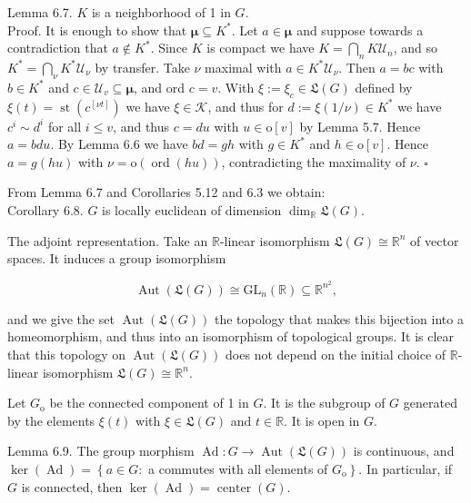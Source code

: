 \documentclass[10pt]{article}
\begin{document}
Lemma 6.7. $K$ is a neighborhood of 1 in $G$.\\
Proof. It is enough to show that $\boldsymbol{\mu} \subseteq K^{*}$. Let $a \in \boldsymbol{\mu}$ and suppose towards a contradiction that $a \notin K^{*}$. Since $K$ is compact we have $K=\bigcap_{n} K \mathcal{U}_{n}$, and so $K^{*}=\bigcap_{\nu} K^{*} \mathcal{U}_{\nu}$ by transfer. Take $\nu$ maximal with $a \in K^{*} \mathcal{U}_{\nu}$. Then $a=b c$ with $b \in K^{*}$ and $c \in \mathcal{U}_{v} \subseteq \boldsymbol{\mu}$, and ord $c=v$. With $\xi:=\xi_{c} \in \mathfrak{L}(G)$ defined by $\xi(t)=\operatorname{st}\left(c^{[\nu t]}\right)$ we have $\xi \in \mathcal{K}$, and thus for $d:=\xi(1 / \nu) \in K^{*}$ we have $c^{i} \sim d^{i}$ for all $i \leq v$, and thus $c=d u$ with $u \in \mathrm{o}[v]$ by Lemma 5.7. Hence $a=b d u$. By Lemma 6.6 we have $b d=g h$ with $g \in K^{*}$ and $h \in \mathrm{o}[v]$. Hence $a=g(h u)$ with $\nu=\mathrm{o}(\operatorname{ord}(h u))$, contradicting the maximality of $\nu$. \(\square\)

From Lemma 6.7 and Corollaries 5.12 and 6.3 we obtain:\\
Corollary 6.8. $G$ is locally euclidean of dimension $\operatorname{dim}_{\mathbb{R}} \mathfrak{L}(G)$.

The adjoint representation. Take an $\mathbb{R}$-linear isomorphism $\mathfrak{L}(G) \cong \mathbb{R}^{n}$ of vector spaces. It induces a group isomorphism

$$
\operatorname{Aut}(\mathfrak{L}(G)) \cong \mathrm{GL}_{n}(\mathbb{R}) \subseteq \mathbb{R}^{n^{2}},
$$

and we give the set $\operatorname{Aut}(\mathfrak{L}(G))$ the topology that makes this bijection into a homeomorphism, and thus into an isomorphism of topological groups. It is clear that this topology on $\operatorname{Aut}(\mathfrak{L}(G))$ does not depend on the initial choice of $\mathbb{R}$-linear isomorphism $\mathfrak{L}(G) \cong \mathbb{R}^{n}$.

Let $G_{\mathrm{o}}$ be the connected component of 1 in $G$. It is the subgroup of $G$ generated by the elements $\xi(t)$ with $\xi \in \mathfrak{L}(G)$ and $t \in \mathbb{R}$. It is open in $G$.

Lemma 6.9. The group morphism $\operatorname{Ad}: G \rightarrow \operatorname{Aut}(\mathfrak{L}(G))$ is continuous, and $\operatorname{ker}(\operatorname{Ad})=\left\{a \in G:\right.$ a commutes with all elements of $\left.G_{\mathrm{o}}\right\}$. In particular, if $G$ is connected, then $\operatorname{ker}(\operatorname{Ad})=\operatorname{center}(G)$.
\end{document}
